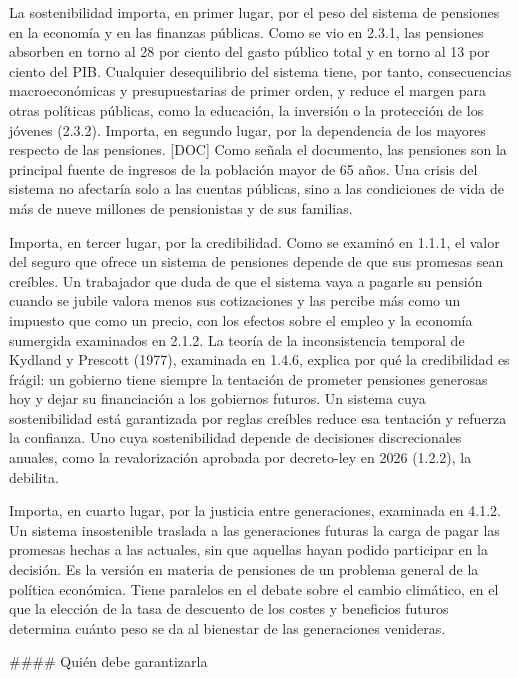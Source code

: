\documentclass[10pt,a4paper]{article}
\begin{document}
La sostenibilidad importa, en primer lugar, por el peso del sistema de pensiones en la economía y en las finanzas públicas. Como se vio en 2.3.1, las pensiones absorben en torno al 28 por ciento del gasto público total y en torno al 13 por ciento del PIB. Cualquier desequilibrio del sistema tiene, por tanto, consecuencias macroeconómicas y presupuestarias de primer orden, y reduce el margen para otras políticas públicas, como la educación, la inversión o la protección de los jóvenes (2.3.2). Importa, en segundo lugar, por la dependencia de los mayores respecto de las pensiones. [DOC] Como señala el documento, las pensiones son la principal fuente de ingresos de la población mayor de 65 años. Una crisis del sistema no afectaría solo a las cuentas públicas, sino a las condiciones de vida de más de nueve millones de pensionistas y de sus familias.

Importa, en tercer lugar, por la credibilidad. Como se examinó en 1.1.1, el valor del seguro que ofrece un sistema de pensiones depende de que sus promesas sean creíbles. Un trabajador que duda de que el sistema vaya a pagarle su pensión cuando se jubile valora menos sus cotizaciones y las percibe más como un impuesto que como un precio, con los efectos sobre el empleo y la economía sumergida examinados en 2.1.2. La teoría de la inconsistencia temporal de Kydland y Prescott (1977), examinada en 1.4.6, explica por qué la credibilidad es frágil: un gobierno tiene siempre la tentación de prometer pensiones generosas hoy y dejar su financiación a los gobiernos futuros. Un sistema cuya sostenibilidad está garantizada por reglas creíbles reduce esa tentación y refuerza la confianza. Uno cuya sostenibilidad depende de decisiones discrecionales anuales, como la revalorización aprobada por decreto-ley en 2026 (1.2.2), la debilita.

Importa, en cuarto lugar, por la justicia entre generaciones, examinada en 4.1.2. Un sistema insostenible traslada a las generaciones futuras la carga de pagar las promesas hechas a las actuales, sin que aquellas hayan podido participar en la decisión. Es la versión en materia de pensiones de un problema general de la política económica. Tiene paralelos en el debate sobre el cambio climático, en el que la elección de la tasa de descuento de los costes y beneficios futuros determina cuánto peso se da al bienestar de las generaciones venideras.

#### Quién debe garantizarla
\end{document}
